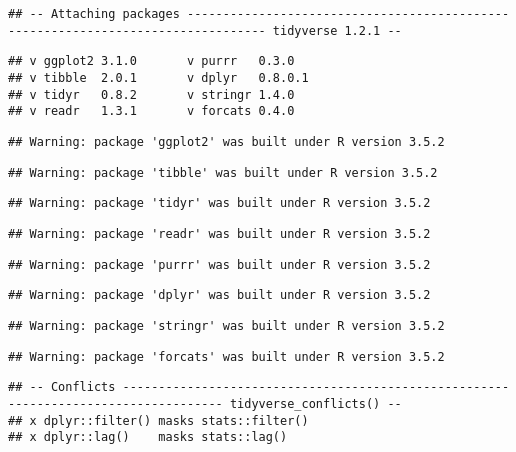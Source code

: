 \documentclass[12pt,]{article}
\begin{document}
\begin{verbatim}
## -- Attaching packages --------------------------------------------------------------------------------- tidyverse 1.2.1 --
\end{verbatim}

\begin{verbatim}
## v ggplot2 3.1.0       v purrr   0.3.0  
## v tibble  2.0.1       v dplyr   0.8.0.1
## v tidyr   0.8.2       v stringr 1.4.0  
## v readr   1.3.1       v forcats 0.4.0
\end{verbatim}

\begin{verbatim}
## Warning: package 'ggplot2' was built under R version 3.5.2
\end{verbatim}

\begin{verbatim}
## Warning: package 'tibble' was built under R version 3.5.2
\end{verbatim}

\begin{verbatim}
## Warning: package 'tidyr' was built under R version 3.5.2
\end{verbatim}

\begin{verbatim}
## Warning: package 'readr' was built under R version 3.5.2
\end{verbatim}

\begin{verbatim}
## Warning: package 'purrr' was built under R version 3.5.2
\end{verbatim}

\begin{verbatim}
## Warning: package 'dplyr' was built under R version 3.5.2
\end{verbatim}

\begin{verbatim}
## Warning: package 'stringr' was built under R version 3.5.2
\end{verbatim}

\begin{verbatim}
## Warning: package 'forcats' was built under R version 3.5.2
\end{verbatim}

\begin{verbatim}
## -- Conflicts ------------------------------------------------------------------------------------ tidyverse_conflicts() --
## x dplyr::filter() masks stats::filter()
## x dplyr::lag()    masks stats::lag()
\end{verbatim}
\end{document}
